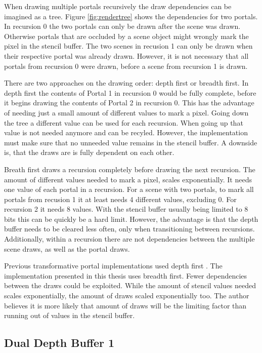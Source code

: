 When drawing multiple portals recursively the draw dependencies can be imagined as a tree. Figure \ref{fig:rendertree} shows the dependencies for two portals. In recursion 0 the two portals can only be drawn after the scene was drawn. Otherwise portals that are occluded by a scene object might wrongly mark the pixel in the stencil buffer. The two scenes in recusion 1 can only be drawn when their respective portal was already drawn. However, it is not necessary that all portals from recursion 0 were drawn, before a scene from recursion 1 is drawn.

There are two approaches on the drawing order: depth first or breadth first. In depth first the contents of Portal 1 in recursion 0 would be fully complete, before it begins drawing the contents of Portal 2 in recursion 0. This has the advantage of needing just a small amount of different values to mark a pixel. Going down the tree a different value can be used for each recursion. When going up that value is not needed anymore and can be recyled. However, the implementation must make sure that no unneeded value remains in the stencil buffer. A downside is, that the draws are is fully dependent on each other.

Breath first draws a recursion completely before drawing the next recursion. The amount of different values needed to mark a pixel, scales exponentially. It needs one value of each portal in a recursion. For a scene with two portals, to mark all portals from recusion 1 it at least needs 4 different values, excluding 0. For recursion 2 it needs 8 values. With the stencil buffer usually being limited to 8 bits this can be quickly be a hard limit. However, the advantage is that the depth buffer needs to be cleared less often, only when transitioning between recursions. Additionally, within a recursion there are not dependencies between the multiple scene draws, as well as the portal draws.

Previous transformative portal implementations used depth first \cite{lowe:2005:technique,lecture:portalProblems}. The implementation presented in this thesis uses breadth first. Fewer dependencies between the draws could be exploited. While the amount of stencil values needed scales exponentially, the amount of draws scaled exponentially too. The author believes it is more likely that amount of draws will be the limiting factor than running out of values in the stencil buffer.

\subsection{Dual Depth Buffer 1}

